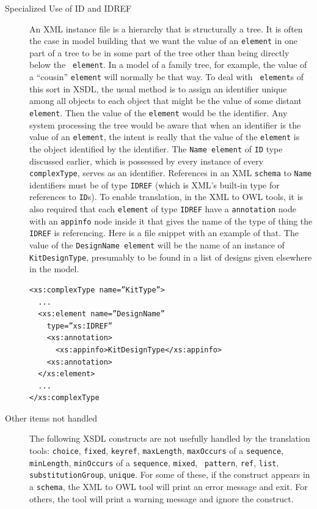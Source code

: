 \documentclass[preprint,12pt]{elsarticle}
\begin{document}
\begin{description}
\item [Specialized Use of ID and IDREF ] An XML instance file is a
  hierarchy that is structurally a tree. It is often the case in model
  building that we want the value of an {\tt element} in one part of a tree
  to be in some part of the tree other than being directly below the {\tt
    element}. In a model of a family tree, for example, the value of a
  “cousin” {\tt element} will normally be that way. To deal with {\tt
    element}s of this sort in XSDL, the usual method is to assign an
  identifier unique among all objects to each object that might be the
  value of some distant {\tt element}. Then the value of the {\tt element}
  would be the identifier. Any system processing the tree would be aware
  that when an identifier is the value of an {\tt element}, the intent is
  really that the value of the {\tt element} is the object identified by
  the identifier. The {\tt Name element} of {\tt ID} type discussed
  earlier, which is possessed by every instance of every {\tt complexType},
  serves as an identifier. References in an XML {\tt schema} to {\tt Name}
  identifiers must be of type {\tt IDREF} (which is XML's built-in type for
  references to {\tt ID}s). To enable translation, in the XML to OWL tools,
  it is also required that each {\tt element} of type {\tt IDREF} have a
  {\tt annotation} node with an {\tt appinfo} node inside it that gives the
  name of the type of thing the {\tt IDREF} is referencing. Here is a file
  snippet with an example of that. The value of the {\tt DesignName
    element} will be the name of an instance of {\tt KitDesignType},
  presumably to be found in a list of designs given elsewhere in the model.

\begin{verbatim}
<xs:complexType name=”KitType”>
  ...
  <xs:element name=”DesignName”
    type=”xs:IDREF”
    <xs:annotation>
      <xs:appinfo>KitDesignType</xs:appinfo>
    <xs:annotation>
  </xs:element>
  ...
</xs:complexType
\end{verbatim}

\item [Other items not handled] The following XSDL constructs are not
  usefully handled by the translation tools: {\tt choice}, {\tt fixed},
  {\tt keyref}, {\tt maxLength}, {\tt maxOccurs} of a {\tt sequence}, {\tt
    minLength}, {\tt minOccurs} of a {\tt sequence}, {\tt mixed}, {\tt
    pattern}, {\tt ref}, {\tt list}, {\tt substitutionGroup}, {\tt unique}.
  For some of these, if the construct appears in a {\tt schema}, the XML to
  OWL tool will print an error message and exit. For others, the tool will
  print a warning message and ignore the construct.
\end{description}
\end{document}
